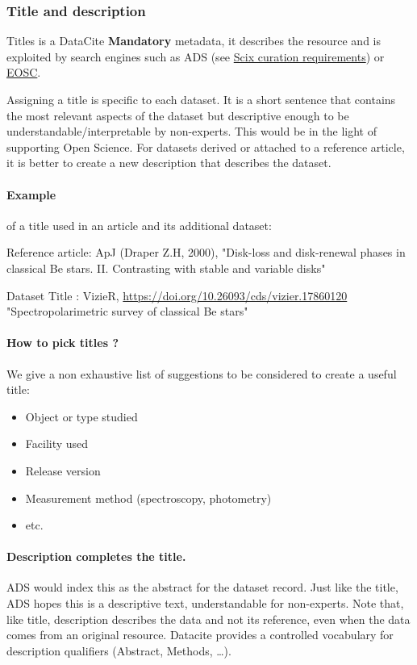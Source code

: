 \documentclass[11pt,a4paper]{ivoa}
\begin{document}
\subsubsection{Title and description}\hypertarget{title-and-description}{}\label{sec:title-and-description}

Titles is a DataCite \textbf{Mandatory} metadata, it describes the resource and is exploited by search engines such as ADS (see \hyperlink{scix-curation-requirements}{Scix curation requirements}) or \href{https://eosc.eu/}{EOSC}.

Assigning a title is specific to each dataset. It is a short sentence that contains the most relevant aspects of the dataset but descriptive enough to be understandable/interpretable by non-experts. This would be in the light of supporting Open Science. For datasets derived or attached to a reference article, it is better to create a new description that describes the dataset.

\paragraph{Example} of a title used in an article and its additional dataset:

Reference article: ApJ (Draper Z.H, 2000), 
"Disk-loss and disk-renewal phases in classical Be stars. II. Contrasting with stable and variable disks"

Dataset Title : VizieR, \url{https://doi.org/10.26093/cds/vizier.17860120}\newline
"Spectropolarimetric survey of classical Be stars"

\paragraph{How to pick titles ?}
We give a non exhaustive list of suggestions to be considered to create a useful title:

\begin{itemize}
\item{} Object or type studied
\item{} Facility used
\item{} Release version
\item{} Measurement method (spectroscopy, photometry)
\item{} etc.
\end{itemize}

\paragraph{Description completes the title.}  ADS would index this as the abstract for the dataset record. Just like the title, ADS hopes this is a descriptive text, understandable for non-experts. Note that, like title, description describes the data and not its reference, even when the data comes from an original resource.\newline
Datacite provides a controlled vocabulary for description qualifiers (Abstract, Methods, \ldots{}).
\end{document}
